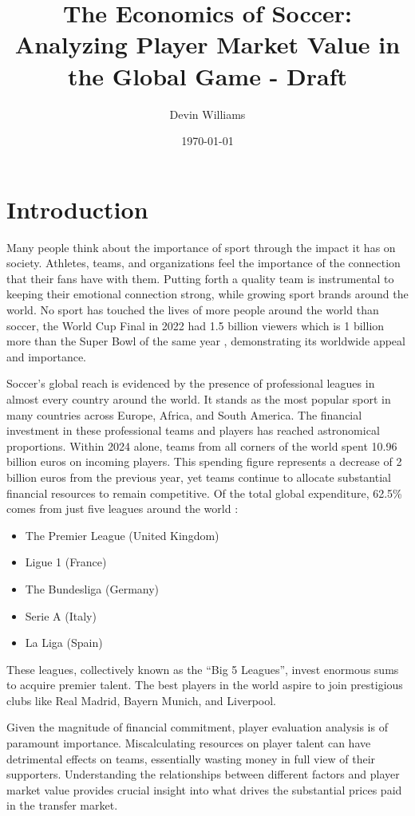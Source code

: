 \documentclass[12pt,a4paper]{article}
\title{\textbf{The Economics of Soccer: Analyzing Player Market Value in the Global Game - Draft}}
\author{Devin Williams}
\date{\today}
\begin{document}
\maketitle

\section{Introduction}

Many people think about the importance of sport through the impact it has on society. Athletes, teams, and organizations feel the importance of the connection that their fans have with them. Putting forth a quality team is instrumental to keeping their emotional connection strong, while growing sport brands around the world. No sport has touched the lives of more people around the world than soccer, the World Cup Final in 2022 had 1.5 billion viewers which is 1 billion more than the Super Bowl of the same year \citep{FIFA_Views}, demonstrating its worldwide appeal and importance. 

Soccer's global reach is evidenced by the presence of professional leagues in almost every country around the world. It stands as the most popular sport in many countries across Europe, Africa, and South America. The financial investment in these professional teams and players has reached astronomical proportions. Within 2024 alone, teams from all corners of the world spent 10.96 billion euros on incoming players. This spending figure represents a decrease of 2 billion euros from the previous year, yet teams continue to allocate substantial financial resources to remain competitive. Of the total global expenditure, 62.5\% comes from just five leagues around the world \citep{Global_economic}:

\begin{itemize}
    \item The Premier League (United Kingdom)
    \item Ligue 1 (France)
    \item The Bundesliga (Germany)
    \item Serie A (Italy)
    \item La Liga (Spain)
\end{itemize}

These leagues, collectively known as the ``Big 5 Leagues'', invest enormous sums to acquire premier talent. The best players in the world aspire to join prestigious clubs like Real Madrid, Bayern Munich, and Liverpool.

Given the magnitude of financial commitment, player evaluation analysis is of paramount importance. Miscalculating resources on player talent can have detrimental effects on teams, essentially wasting money in full view of their supporters. Understanding the relationships between different factors and player market value provides crucial insight into what drives the substantial prices paid in the transfer market.
\end{document}
